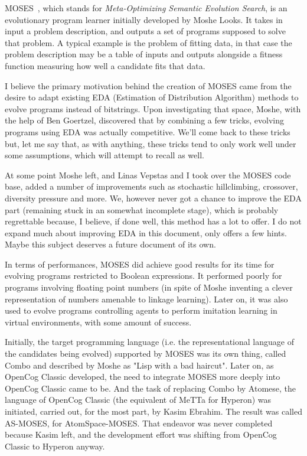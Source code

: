 \documentclass[]{report}
\begin{document}
MOSES~\cite{Looks06abstractcompetent}, which stands
for \emph{Meta-Optimizing Semantic Evolution Search}, is an
evolutionary program learner initially developed by Moshe Looks.  It
takes in input a problem description, and outputs a set of programs
supposed to solve that problem.  A typical example is the problem of
fitting data, in that case the problem description may be a table of
inputs and outputs alongside a fitness function measuring how well a
candidate fits that data.

I believe the primary motivation behind the creation of MOSES came
from the desire to adapt existing EDA (Estimation of Distribution
Algorithm) methods to evolve programs instead of bitstrings.  Upon
investigating that space, Moshe, with the help of Ben Goertzel,
discovered that by combining a few tricks, evolving programs using EDA
was actually competitive.  We'll come back to these tricks but, let me
say that, as with anything, these tricks tend to only work well under
some assumptions, which will attempt to recall as well.

At some point Moshe left, and Linas Vepstas and I took over the MOSES
code base, added a number of improvements such as stochastic
hillclimbing, crossover, diversity pressure and more.  We, however
never got a chance to improve the EDA part (remaining stuck in an
somewhat incomplete stage), which is probably regrettable because, I
believe, if done well, this method has a lot to offer.  I do not
expand much about improving EDA in this document, only offers a few
hints.  Maybe this subject deserves a future document of its own.

In terms of performances, MOSES did achieve good results for its time
for evolving programs restricted to Boolean expressions.  It performed
poorly for programs involving floating point numbers (in spite of
Moshe inventing a clever representation of numbers amenable to linkage
learning).  Later on, it was also used to evolve programs controlling
agents to perform imitation learning in virtual environments, with
some amount of success.

Initially, the target programming language (i.e. the representational
language of the candidates being evolved) supported by MOSES was its
own thing, called Combo and described by Moshe as "Lisp with a bad
haircut".  Later on, as OpenCog Classic developed, the need to
integrate MOSES more deeply into OpenCog Classic came to be.  And the
task of replacing Combo by Atomese, the language of OpenCog Classic
(the equivalent of MeTTa for Hyperon) was initiated, carried out, for
the most part, by Kasim Ebrahim.  The result was called AS-MOSES, for
AtomSpace-MOSES.  That endeavor was never completed because Kasim
left, and the development effort was shifting from OpenCog Classic to
Hyperon anyway.
\end{document}
